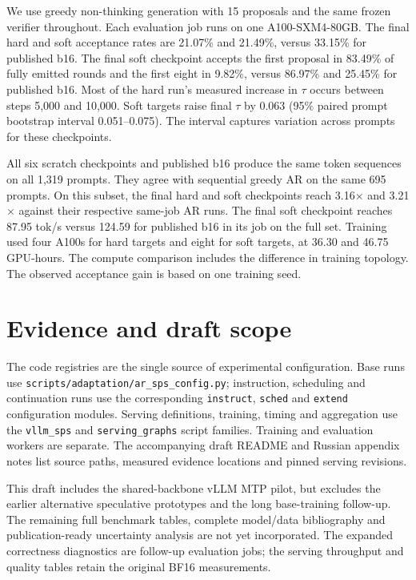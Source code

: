 We use greedy non-thinking generation with 15 proposals and the same
frozen verifier throughout. Each evaluation job runs on one A100-SXM4-80GB.
The final hard and soft acceptance rates are 21.07\% and 21.49\%, versus
33.15\% for published b16. The final soft checkpoint accepts the first
proposal in 83.49\% of fully emitted rounds and the first eight in 9.82\%,
versus 86.97\% and 25.45\% for published b16. Most of the hard run's
measured increase in $\tau$ occurs between steps 5,000 and 10,000.
Soft targets raise final $\tau$ by 0.063 (95\% paired prompt bootstrap
interval 0.051--0.075). The interval captures variation across prompts
for these checkpoints.

All six scratch checkpoints and published b16 produce the same token
sequences on all 1,319 prompts. They agree with sequential greedy AR on
the same 695 prompts. On this subset, the final hard and soft checkpoints
reach 3.16$\times$ and 3.21$\times$ against their respective same-job AR
runs. The final soft checkpoint reaches 87.95 tok/s versus 124.59 for
published b16 in its job on the full set. Training used four A100s for
hard targets and eight for soft targets, at 36.30 and 46.75 GPU-hours.
The compute comparison includes the difference in training topology.
The observed acceptance gain is based on one training seed.

\section{Evidence and draft scope}
The code registries are the single source of experimental configuration. Base runs use \texttt{scripts/adaptation/ar\_sps\_config.py}; instruction, scheduling and continuation runs use the corresponding \texttt{instruct}, \texttt{sched} and \texttt{extend} configuration modules. Serving definitions, training, timing and aggregation use the \texttt{vllm\_sps} and \texttt{serving\_graphs} script families. Training and evaluation workers are separate. The accompanying draft README and Russian appendix notes list source paths, measured evidence locations and pinned serving revisions.

This draft includes the shared-backbone vLLM MTP pilot, but excludes the earlier alternative speculative prototypes and the long base-training follow-up. The remaining full benchmark tables, complete model/data bibliography and publication-ready uncertainty analysis are not yet incorporated. The expanded correctness diagnostics are follow-up evaluation jobs; the serving throughput and quality tables retain the original BF16 measurements.
